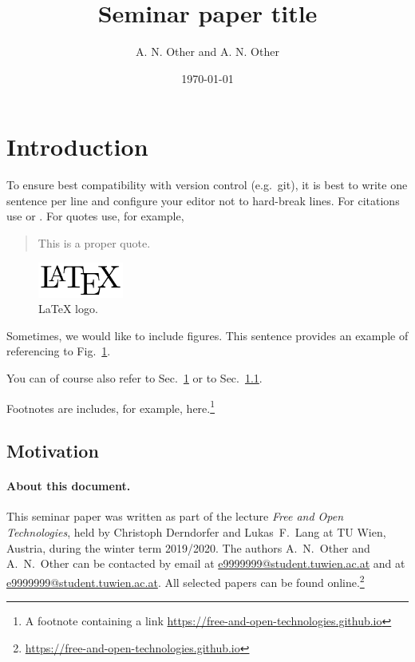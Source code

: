 \documentclass[a4paper, 11pt]{article}
\title{Seminar paper title}
\begin{document}
\date{\today}
\author{A. N. Other and A. N. Other}
\maketitle

\section{Introduction} \label{sec:intro}

To ensure best compatibility with version control (e.g.\ git), it is best to write one sentence per line and configure your editor not to hard-break lines.
For citations use \cite{BakSchaLewRotBla11} or \cite[p.\ 6--8]{BakSchaLewRotBla11}.
For quotes use, for example,
\begin{quote}
	This is a proper quote. \cite[p.\ 6]{BakSchaLewRotBla11}
\end{quote}

\begin{figure}[t]
	\centering
	\includegraphics[width=0.25\textwidth]{figures/logo.png}
\caption{LaTeX logo.} \label{fig:logo}
\end{figure}

Sometimes, we would like to include figures.
This sentence provides an example of referencing to Fig.~\ref{fig:logo}.

You can of course also refer to Sec.~\ref{sec:intro} or to Sec.~\ref{sec:intro:motivation}.

Footnotes are includes, for example, here.\footnote{A footnote containing a link \url{https://free-and-open-technologies.github.io}}

\lipsum[1]

\subsection{Motivation} \label{sec:intro:motivation}

\lipsum[2-4]




\paragraph{About this document.} This seminar paper was written as part of the lecture \emph{Free and Open Technologies}, held by Christoph Derndorfer and Lukas~F.\ Lang at TU Wien, Austria, during the winter term 2019/2020.
The authors A.~N.~Other and A.~N.~Other can be contacted by email at \url{e9999999@student.tuwien.ac.at} and at \url{e9999999@student.tuwien.ac.at}.
All selected papers can be found online.\footnote{\url{https://free-and-open-technologies.github.io}}

\doclicenseThis
\end{document}
